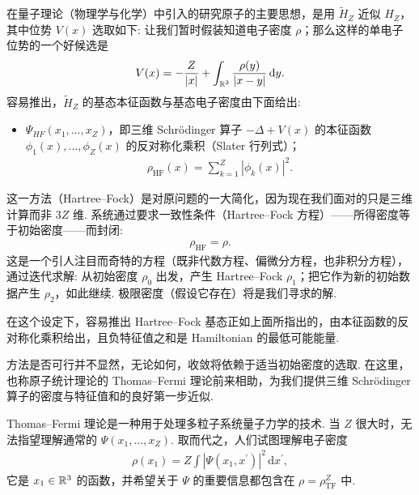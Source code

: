 在量子理论（物理学与化学）中引入的研究原子的主要思想，是用 $\tilde{H}_Z$ 近似 $H_Z$，其中位势 $V(x)$ 选取如下: 让我们暂时假装知道电子密度 $\rho$；那么这样的单电子位势的一个好候选是
\begin{align*}
  V(x)=-\frac{Z}{\left|x\right|}+\int_{\mathbb{R}^{3}}\frac{\rho(y)}{\left|x-y\right|}\,\mathrm{d}y.
\end{align*}
容易推出，$\widetilde{H}_{Z}$ 的基态本征函数与基态电子密度由下面给出:
\begin{itemize}
\item $\Psi_{HF}(x_1,\ldots,x_Z)$，即三维 Schrödinger 算子 $-\Delta + V(x)$ 的本征函数 $\phi_1(x),\ldots,\phi_Z(x)$ 的反对称化乘积（Slater 行列式）；
\begin{align*}
  \rho_{\mathrm{HF}}(x)=\sum_{k=1}^{Z}|\phi_{k}(x)|^{2}.
\end{align*}
\end{itemize}
这一方法（Hartree--Fock）是对原问题的一大简化，因为现在我们面对的只是三维计算而非 $3Z$ 维. 系统通过要求一致性条件（Hartree--Fock 方程）——所得密度等于初始密度——而封闭:
\begin{align*}
  \rho_{\mathrm{HF}}=\rho.
\end{align*}
这是一个引人注目而奇特的方程（既非代数方程、偏微分方程，也非积分方程），通过迭代求解: 从初始密度 $\rho_0$ 出发，产生 Hartree--Fock $\rho_1$；把它作为新的初始数据产生 $\rho_2$，如此继续. 极限密度（假设它存在）将是我们寻求的解.

在这个设定下，容易推出 Hartree--Fock 基态正如上面所指出的，由本征函数的反对称化乘积给出，且负特征值之和是 Hamiltonian 的最低可能能量.

方法是否可行并不显然，无论如何，收敛将依赖于适当初始密度的选取. 在这里，也称原子统计理论的 Thomas--Fermi 理论前来相助，为我们提供三维 Schrödinger 算子的密度与特征值和的良好第一步近似.

Thomas--Fermi 理论是一种用于处理多粒子系统量子力学的技术. 当 $Z$ 很大时，无法指望理解通常的 $\Psi(x_1, \ldots, x_Z)$. 取而代之，人们试图理解电子密度
\begin{align*}
  \rho(x_{1})=Z\int|\Psi(x_{1},x^{\prime})|^{2}\,\mathrm{d}x^{\prime},
\end{align*}
它是 $x_1 \in \mathbb{R}^3$ 的函数，并希望关于 $\Psi$ 的重要信息都包含在 $\rho = \rho_{\mathrm{TF}}^Z$ 中.

